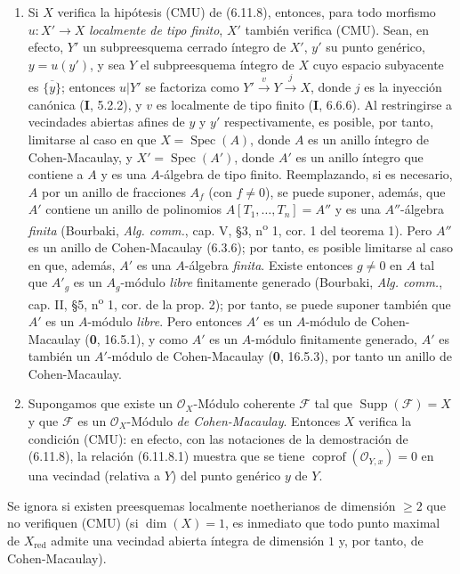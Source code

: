 \begin{remarks}[6.11.9]
\label{IV.2.s6.11.9-fr}
\begin{enumerate}
\item[(i)] Si $X$ verifica la hipótesis (CMU) de (6.11.8), entonces, para todo
morfismo $u:X'\to X$ \emph{localmente de tipo finito}, $X'$ también verifica (CMU).
Sean, en efecto, $Y'$ un subpreesquema cerrado íntegro de $X'$, $y'$ su punto
genérico, $y=u(y')$, y sea $Y$ el subpreesquema íntegro de $X$ cuyo
espacio subyacente es $\overline{\{y\}}$; entonces $u|Y'$ se factoriza como
$Y'\xrightarrow{v}Y\xrightarrow{j}X$, donde $j$ es la inyección canónica
(\textbf I, 5.2.2), y $v$ es localmente de tipo finito (\textbf I, 6.6.6). Al restringirse
a vecindades abiertas afines de $y$ y $y'$ respectivamente,
es posible, por tanto, limitarse al caso en que $X=\operatorname{Spec}(A)$, donde $A$ es un
anillo íntegro de Cohen-Macaulay, y $X'=\operatorname{Spec}(A')$, donde $A'$
es un anillo
íntegro que contiene a $A$ y es una $A$-álgebra de tipo finito.
Reemplazando, si es necesario, $A$ por un anillo de fracciones $A_f$ (con $f\ne0$),
se puede suponer, además, que $A'$ contiene un anillo de polinomios
$A[T_1,\ldots,T_n]=A''$ y es una $A''$-álgebra \emph{finita} (Bourbaki,
\emph{Alg. comm.}, cap. V, \S3, n\textsuperscript{o} 1, cor. 1 del teorema 1).
Pero $A''$ es un anillo de Cohen-Macaulay (6.3.6); por tanto, es posible limitarse
al caso en que, además, $A'$ es una $A$-álgebra \emph{finita}. Existe entonces $g\ne0$ en
$A$ tal que $A'_g$ es un $A_g$-módulo \emph{libre} finitamente generado (Bourbaki,
\emph{Alg. comm.}, cap. II, \S5, n\textsuperscript{o} 1, cor. de la
prop. 2); por tanto, se puede suponer también que $A'$ es un $A$-módulo
\emph{libre}. Pero entonces $A'$ es un $A$-módulo de Cohen-Macaulay (\textbf 0, 16.5.1), y
como $A'$ es un $A$-módulo finitamente generado, $A'$ es también un $A'$-módulo de
Cohen-Macaulay (\textbf 0, 16.5.3), por tanto un anillo de Cohen-Macaulay.
\item[(ii)] Supongamos que existe un $\mathcal O_X$-Módulo coherente
$\mathcal F$ tal que $\operatorname{Supp}(\mathcal F)=X$ y que
$\mathcal F$ es un $\mathcal O_X$-Módulo \emph{de Cohen-Macaulay}. Entonces $X$
verifica la condición (CMU): en efecto, con las notaciones de la demostración
de (6.11.8), la relación (6.11.8.1) muestra que se tiene
$\operatorname{coprof}(\mathcal O_{Y,x})=0$ en una vecindad (relativa a
$Y$) del punto genérico $y$ de $Y$.
\end{enumerate}

Se ignora si existen preesquemas localmente noetherianos de dimensión
$\geq2$ que no verifiquen (CMU) (si $\dim(X)=1$, es inmediato que todo
punto maximal de $X_{\mathrm{red}}$ admite una vecindad abierta íntegra de
dimensión $1$ y, por tanto, de Cohen-Macaulay).
\end{remarks}
